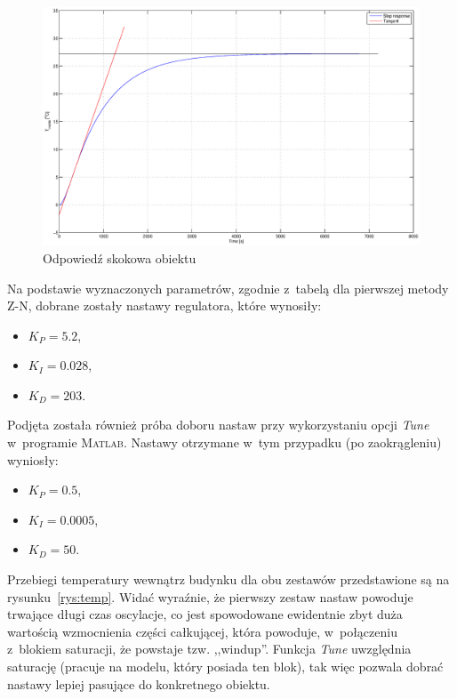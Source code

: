 \documentclass[12pt, a4paper]{article}
\begin{document}
    \begin{figure}[!ht]
    	\centering
    	\includegraphics[width=\textwidth]{../img/odp_skokowa.eps}
    	\caption{Odpowiedź skokowa obiektu}
    	\label{rys:odp_skokowa}
    \end{figure}
    
    Na podstawie wyznaczonych parametrów, zgodnie z~tabelą dla pierwszej metody
    Z-N, dobrane zostały nastawy regulatora, które wynosiły:
    \begin{itemize}
        \item $K_P = 5.2$,
        \item $K_I = 0.028$,
        \item $K_D = 203$.
    \end{itemize}
    Podjęta została również próba doboru nastaw przy wykorzystaniu opcji
    \textit{Tune} w~programie \textsc{Matlab}. Nastawy otrzymane w~tym przypadku
    (po zaokrągleniu) wyniosły:
    \begin{itemize}
        \item $K_P = 0.5$,
        \item $K_I = 0.0005$,
        \item $K_D = 50$.
    \end{itemize}
    
    Przebiegi temperatury wewnątrz budynku dla obu zestawów przedstawione są na
    rysunku~\ref{rys:temp}. Widać wyraźnie, że pierwszy zestaw nastaw powoduje
    trwające długi czas oscylacje, co jest spowodowane ewidentnie zbyt duża
    wartością wzmocnienia części całkującej, która powoduje, w~połączeniu
    z~blokiem saturacji, że powstaje tzw. ,,windup''. Funkcja \textit{Tune}
    uwzględnia saturację (pracuje na modelu, który posiada ten blok), tak więc
    pozwala dobrać nastawy lepiej pasujące do konkretnego obiektu.
    
\end{document}
